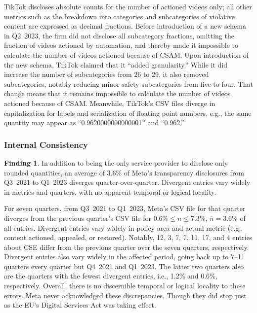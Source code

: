 \documentclass[anonymous,nonacm,screen,12pt]{acmart}
\newcommand\V[1]{{#1}}
\newcommand\V[1]{\textsc{\MakeLowercase{#1}}}
\theoremstyle{definition}
\newtheorem{finding}{Finding}
\begin{document}
TikTok discloses absolute counts for the number of actioned videos only; all
other metrics such as the breakdown into categories and subcategories of
violative content are expressed as decimal fractions. Before introduction of a
new schema in \V{Q2}~2023, the firm did not disclose all subcategory fractions,
omitting the fraction of videos actioned by automation, and thereby made it
impossible to calculate the number of videos actioned because of \V{CSAM}. Upon
introduction of the new schema, TikTok claimed that it ``added granularity.''
While it did increase the number of subcategories from 26 to 29, it also removed
subcategories, notably reducing minor safety subcategories from five to four.
That change means that it remains impossible to calculate the number of videos
actioned because of \V{CSAM}. Meanwhile, TikTok's \V{CSV} files diverge in
capitalization for labels and serialization of floating point numbers, e.g., the
same quantity may appear as ``0.9620000000000001'' and ``0.962.''


\subsubsection{Internal Consistency}

\begin{finding}
In addition to being the only service provider to disclose only rounded
quantities, an average of 3.6\% of Meta's transparency disclosures from
\V{Q3}~2021 to \V{Q1}~2023 diverges quarter-over-quarter. Divergent entries vary
widely in metrics and quarters, with no apparent temporal or logical locality.
\end{finding}

\noindent{}For seven quarters, from \V{Q3}~2021 to \V{Q1}~2023, Meta's \V{CSV}
file for that quarter diverges from the previous quarter's \V{CSV} file for
$0.6\%\leq{}n\leq{}7.3\%$, $\overline{n}=3.6\%$ of all entries. Divergent
entries vary widely in policy area and actual metric (e.g., content actioned,
appealed, or restored). Notably, 12, 3, 7, 7, 11, 17, and 4 entries about
\V{CSE} differ from the previous quarter over the seven quarters, respectively.
Divergent entries also vary widely in the affected period, going back up to
7--11 quarters every quarter but \V{Q4}~2021 and \V{Q1}~2023. The latter two
quarters also are the quarters with the fewest divergent entries, i.e., 1.2\%
and 0.6\%, respectively. Overall, there is no discernible temporal or logical
locality to these errors. Meta never acknowledged these discrepancies. Though
they did stop just as the \V{EU}'s Digital Services Act was taking effect.
\end{document}
